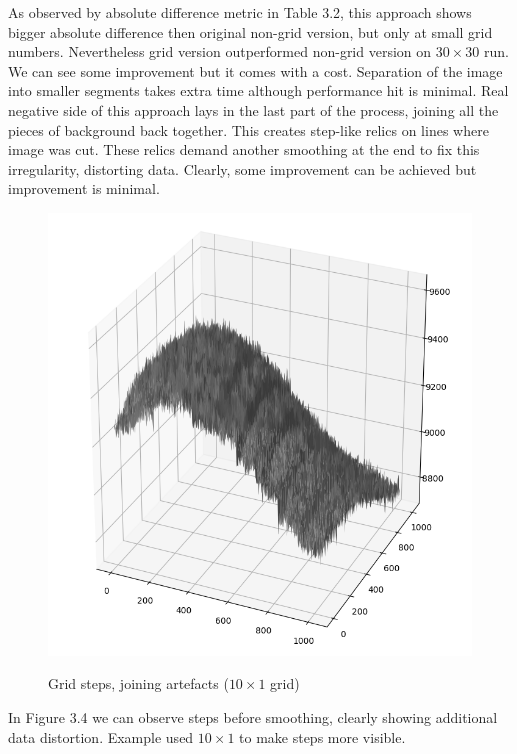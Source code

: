 \documentclass[12pt, a4paper, oneside]{book}
\begin{document}
As observed by absolute difference metric in Table 3.2, this approach shows bigger absolute difference then original non-grid version, but only at small grid numbers. Nevertheless grid version outperformed non-grid version on $30 \times 30$ run.
We can see some improvement but it comes with a cost.
Separation of the image into smaller segments takes extra time although performance hit is minimal.
Real negative side of this approach lays in the last part of the process, joining all the pieces of background back together.
This creates step-like relics on lines where image was cut.
These relics demand another smoothing at the end to fix this irregularity, distorting data.
Clearly, some improvement can be achieved but improvement is minimal.

\begin{figure}[!hbt]
    \begin{center}
        \includegraphics[scale=0.50]{images/grid_steps.png}
        \label{img:grid_steps}
        \caption{Grid steps, joining artefacts ($10 \times 1$ grid)}
    \end{center}
\end{figure}

In Figure 3.4 we can observe steps before smoothing, clearly showing additional data distortion.
Example used $10 \times 1$ to make steps more visible.


\backmatter




\listoffigures
\end{document}
